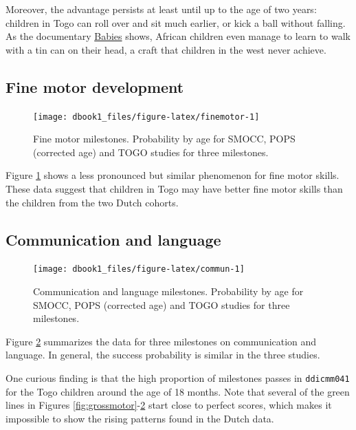 \documentclass[
]{book}
\begin{document}
Moreover, the advantage persists at least until up to the age of two years: children in Togo can roll over and sit much earlier, or kick a ball without falling. As the documentary \href{https://www.youtube.com/watch?v=vB36k0hGxDM}{Babies} shows, African children even manage to learn to walk with a tin can on their head, a craft that children in the west never achieve.

\hypertarget{fine-motor-development}{%
\subsection{Fine motor development}\label{fine-motor-development}}

\begin{figure}

{\centering \texttt{[image: dbook1\_files/figure-latex/finemotor-1]} 

}

\caption{Fine motor milestones. Probability by age for SMOCC, POPS (corrected age) and TOGO studies for three milestones.}\label{fig:finemotor}
\end{figure}



Figure \ref{fig:finemotor} shows a less pronounced but similar phenomenon for fine motor skills. These data suggest that children in Togo may have better fine motor skills than the children from the two Dutch cohorts.

\hypertarget{communication-and-language}{%
\subsection{Communication and language}\label{communication-and-language}}

\begin{figure}

{\centering \texttt{[image: dbook1\_files/figure-latex/commun-1]} 

}

\caption{Communication and language milestones. Probability by age for SMOCC, POPS (corrected age) and TOGO studies for three milestones.}\label{fig:commun}
\end{figure}



Figure \ref{fig:commun} summarizes the data for three milestones on communication and language. In general, the success probability is similar in the three studies.

One curious finding is that the high proportion of milestones passes in \texttt{ddicmm041} for the Togo children around the age of 18 months. Note that several of the green lines in Figures \ref{fig:grossmotor}-\ref{fig:commun} start close to perfect scores, which makes it impossible to show the rising patterns found in the Dutch data.
\end{document}
